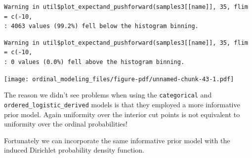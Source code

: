 \documentclass[
  letterpaper,
  DIV=11,
  numbers=noendperiod]{scrartcl}
\begin{document}
\begin{verbatim}
Warning in util$plot_expectand_pushforward(samples3[[name]], 35, flim = c(-10,
: 4063 values (99.2%) fell below the histogram binning.
\end{verbatim}

\begin{verbatim}
Warning in util$plot_expectand_pushforward(samples3[[name]], 35, flim = c(-10,
: 0 values (0.0%) fell above the histogram binning.
\end{verbatim}

\texttt{[image: ordinal\_modeling\_files/figure-pdf/unnamed-chunk-43-1.pdf]}

The reason we didn't see problems when using the \texttt{categorical}
and \texttt{ordered\_logistic\_derived} models is that they employed a
more informative prior model. Again uniformity over the interior cut
points is not equivalent to uniformity over the ordinal probabilities!

Fortunately we can incorporate the same informative prior model with the
induced Dirichlet probability density function.
\end{document}
